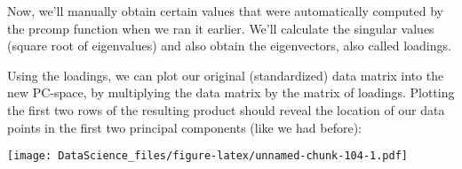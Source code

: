 \documentclass[
]{book}
\newenvironment{Shaded}{\begin{snugshade}}{\end{snugshade}}
\newcommand{\AttributeTok}[1]{\textcolor[rgb]{0.77,0.63,0.00}{#1}}
\newcommand{\FunctionTok}[1]{\textcolor[rgb]{0.00,0.00,0.00}{#1}}
\newcommand{\NormalTok}[1]{#1}
\newcommand{\OtherTok}[1]{\textcolor[rgb]{0.56,0.35,0.01}{#1}}
\newcommand{\SpecialCharTok}[1]{\textcolor[rgb]{0.00,0.00,0.00}{#1}}
\newcommand{\StringTok}[1]{\textcolor[rgb]{0.31,0.60,0.02}{#1}}
\begin{document}
Now, we'll manually obtain certain values that were automatically computed by the prcomp function when we ran it earlier. We'll calculate the singular values (square root of eigenvalues) and also obtain the eigenvectors, also called loadings.

\begin{Shaded}
\end{Shaded}

Using the loadings, we can plot our original (standardized) data matrix into the new PC-space, by multiplying the data matrix by the matrix of loadings. Plotting the first two rows of the resulting product should reveal the location of our data points in the first two principal components (like we had before):

\begin{Shaded}
\end{Shaded}

\texttt{[image: DataScience\_files/figure-latex/unnamed-chunk-104-1.pdf]}
\end{document}
